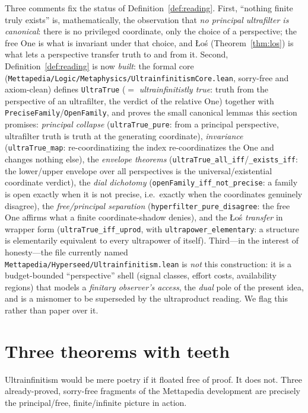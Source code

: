 \documentclass[]{article}
\theoremstyle{definition}
\theoremstyle{remark}
\newcommand{\code}[1]{\texttt{#1}}
\newcommand{\lpath}[1]{{\ttfamily\nolinkurl{#1}}}
\begin{document}
Three comments fix the status of Definition~\ref{def:reading}. First, ``nothing
finite truly exists'' is, mathematically, the observation that \emph{no principal
ultrafilter is canonical}: there is no privileged coordinate, only the choice of a
perspective; the free One is what is invariant under that choice, and {\L}o\'s
(Theorem~\ref{thm:los}) is what lets a perspective transfer truth to and from it.
Second, Definition~\ref{def:reading} is now \emph{built}: the formal core
(\lpath{Mettapedia/Logic/Metaphysics/UltrainfinitismCore.lean}, sorry-free and
axiom-clean) defines \code{UltraTrue} ($=$ \emph{ultrainfinitistly true}: truth from
the perspective of an ultrafilter, the verdict of the relative One) together with
\code{PreciseFamily}/\code{OpenFamily}, and proves the small canonical lemmas this
section promises: \emph{principal collapse} (\code{ultraTrue\_pure}: from a principal
perspective, ultrafilter truth is truth at the generating coordinate),
\emph{invariance} (\code{ultraTrue\_map}: re-coordinatizing the index
re-coordinatizes the One and changes nothing else), the \emph{envelope theorems}
(\code{ultraTrue\_all\_iff}/\code{\_exists\_iff}: the lower/upper envelope over all
perspectives is the universal/existential coordinate verdict), the \emph{dial
dichotomy} (\code{openFamily\_iff\_not\_precise}: a family is open exactly when it is
not precise, i.e.\ exactly when the coordinates genuinely disagree), the
\emph{free/principal separation} (\code{hyperfilter\_pure\_disagree}: the free One
affirms what a finite coordinate-shadow denies), and the {\L}o\'s
\emph{transfer} in wrapper form (\code{ultraTrue\_iff\_uprod}, with
\code{ultrapower\_elementary}: a structure is elementarily equivalent to every
ultrapower of itself). Third---in
the interest of honesty---the file currently named
\lpath{Mettapedia/Hyperseed/Ultrainfinitism.lean} is \emph{not} this construction:
it is a budget-bounded ``perspective'' shell (signal classes, effort costs,
availability regions) that models a \emph{finitary observer's access}, the
\emph{dual} pole of the present idea, and is a misnomer to be superseded by the
ultraproduct reading. We flag this rather than paper over it.

\section{Three theorems with teeth}
\label{sec:teeth}

Ultrainfinitism would be mere poetry if it floated free of proof. It does not.
Three already-proved, sorry-free fragments of the Mettapedia development are
precisely the principal/free, finite/infinite picture in action.
\end{document}
